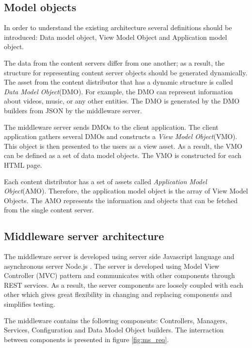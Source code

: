 \subsection{Model objects}

In order to understand the existing architecture several definitions should be introduced: Data model object, View Model Object and Application model object.

The data from the content servers differ from one another; as a result, the structure for representing content server objects should be generated dynamically. The asset from the content distributor that has a dynamic structure is called \textit{Data Model Object}(DMO). For example, the DMO can represent information about videos, music, or any other entities. The DMO is generated by the DMO builders from JSON by the middleware server.

The middleware server sends DMOs to the client application. The client application gathers several DMOs and constructs a \textit{View Model Object}(VMO). This object is then presented to the users as a view asset. As a result, the VMO can be defined as a set of data model objects. The VMO is constructed for each HTML page. 

Each content distributor has a set of assets called \textit{Application Model Object}(AMO). Therefore, the application model object is the array of View Model Objects. The AMO represents the information and objects that can be fetched from the single content server.


\subsection{Middleware server architecture}

The middleware server is developed using server side Javascript language and asynchronous server Node.js \cite{Nodejs}. The server is developed using Model View Controller (MVC) pattern and communicates with other components through REST services. As a result, the server components are loosely coupled with each other which gives great flexibility in changing and replacing components and simplifies testing. 

The middleware contains the following components: Controllers, Managers, Services, Configuration and Data Model Object builders. The interraction between components is presented in figure \ref{fig:ms_req}.

